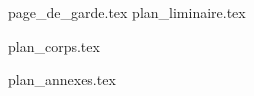 \frontmatter
{page_de_garde.tex}
{plan_liminaire.tex}

\mainmatter
{plan_corps.tex}

\appendix
{}
{plan_annexes.tex}
